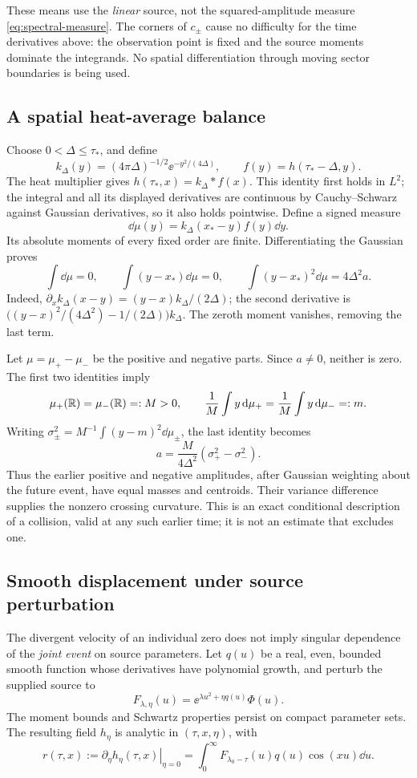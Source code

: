 These means use the \emph{linear} source, not the squared-amplitude
measure \eqref{eq:spectral-measure}. The corners of \(c_\pm\) cause no
difficulty for the time derivatives above: the observation point is
fixed and the source moments dominate the integrands. No spatial
differentiation through moving sector boundaries is being used.

\subsection{A spatial heat-average balance}
Choose \(0<\Delta\leq\tau_*\), and define
\[
 k_\Delta(y)=(4\pi\Delta)^{-1/2}\ee^{-y^2/(4\Delta)},\qquad
 f(y)=h(\tau_*-\Delta,y).
\]
The heat multiplier gives \(h(\tau_*,x)=k_\Delta*f(x)\).
This identity first holds in \(L^2\); the integral and all its displayed
derivatives are continuous by Cauchy--Schwarz against Gaussian
derivatives, so it also holds pointwise. Define a signed measure
\[
 \dd\mu(y)=k_\Delta(x_*-y)f(y)\dd y.
\]
Its absolute moments of every fixed order are finite. Differentiating
the Gaussian proves
\begin{equation}\label{eq:gaussian-moments}
 \int\dd\mu=0,\qquad
 \int(y-x_*)\dd\mu=0,\qquad
 \int(y-x_*)^2\dd\mu=4\Delta^2a.
\end{equation}
Indeed, \(\partial_x k_\Delta(x-y)=(y-x)k_\Delta/(2\Delta)\);
the second derivative is
\(\bigl((y-x)^2/(4\Delta^2)-1/(2\Delta)\bigr)k_\Delta\).
The zeroth moment vanishes, removing the last term.

Let \(\mu=\mu_+-\mu_-\) be the positive and negative parts.
Since \(a\ne0\), neither is zero. The first two identities imply
\[
 \mu_+(\mathbb R)=\mu_-(\mathbb R)=:M>0,\qquad
 \frac1M\int y\,\mathrm d\mu_+=\frac1M\int y\,\mathrm d\mu_-=:m.
\]
Writing \(\sigma_\pm^2=M^{-1}\int(y-m)^2\dd\mu_\pm\), the last
identity becomes
\begin{equation}\label{eq:variance-balance}
 a=\frac{M}{4\Delta^2}(\sigma_+^2-\sigma_-^2).
\end{equation}
Thus the earlier positive and negative amplitudes, after Gaussian
weighting about the future event, have equal masses and centroids.
Their variance difference supplies the nonzero crossing curvature.
This is an exact conditional description of a collision, valid at
any such earlier time; it is not an estimate that excludes one.

\subsection{Smooth displacement under source perturbation}
The divergent velocity of an individual zero does not imply singular
dependence of the \emph{joint event} on source parameters.
Let \(q(u)\) be a real, even, bounded smooth function whose derivatives
have polynomial growth, and perturb the supplied source to
\[
 F_{\lambda,\eta}(u)=\ee^{\lambda u^2+\eta q(u)}\Phi(u).
\]
The moment bounds and Schwartz properties persist on compact
parameter sets. The resulting field \(h_\eta\) is analytic in
\((\tau,x,\eta)\), with
\[
 r(\tau,x):=\left.\partial_\eta h_\eta(\tau,x)\right|_{\eta=0}
 =\int_0^\infty F_{\lambda_0-\tau}(u)q(u)\cos(xu)\dd u.
\]

